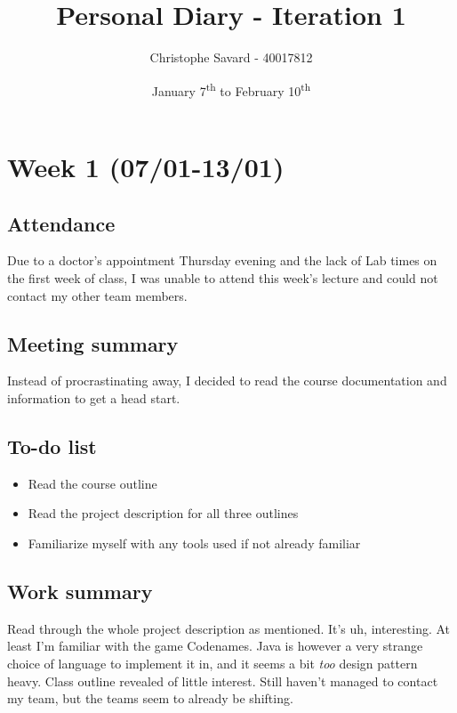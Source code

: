 \documentclass[letterpaper,10pt]{article}
\begin{document}
\title{\Large{\textbf{Personal Diary - Iteration 1}}}
\author{Christophe Savard - 40017812}
\date{January 7\textsuperscript{th} to February 10\textsuperscript{th}}
\maketitle
{}
\clearpage

\tableofcontents
{}
\setcounter{page}{2}
\clearpage


\section{Week 1 (07/01-13/01)}

\subsection{Attendance}
Due to a doctor's appointment Thursday evening and the lack of Lab times on the first week of class, I was unable to attend this week's lecture and could not contact my other team members.

\subsection{Meeting summary}
Instead of procrastinating away, I decided to read the course documentation and information to get a head start.

\subsection{To-do list}
\begin{itemize}
\item Read the course outline
\item Read the project description for all three outlines
\item Familiarize myself with any tools used if not already familiar
\end{itemize}

\subsection{Work summary}
Read through the whole project description as mentioned. It's uh, interesting. At least I'm familiar with the game Codenames. Java is however a very strange choice of language to implement it in, and it seems a bit \textit{too} design pattern heavy. Class outline revealed of little interest. Still haven't managed to contact my team, but the teams seem to already be shifting.
\end{document}
